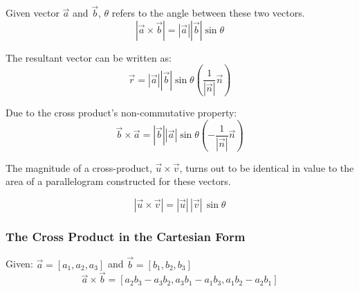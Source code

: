 Given vector $\vec{a}$ and $\vec{b}$, $\theta$ refers to the angle between these two vectors. 
$$\left|\vec{a} \times \vec{b}\right| = \left|\vec{a}\right|\left|\vec{b}\right|\sin \theta$$

The resultant vector can be written as:
$$\vec{r} = \left|\vec{a}\right| \left|\vec{b}\right| \sin \theta \left(\frac{1}{\left|\vec{n}\right|}\vec{n}\right)$$

Due to the cross product's non-commutative property:
$$\vec{b} \times  \vec{a} = \left|\vec{b}\right| \left|\vec{a}\right| \sin \theta (-\frac{1}{\left|\vec{n}\right|}\vec{n})$$

The magnitude of a cross-product, $\vec{u} \times \vec{v}$, turns out to be identical in value to the area of a parallelogram constructed for these vectors. 

\[
|\vec{u}\times\vec{v}|
=
|\vec{u}|\,|\vec{v}|\,\sin\theta
\]

\begin{center}
\end{center}

\subsubsection{The Cross Product in the Cartesian Form}
\begin{definition}
    Given: $\vec{a} = \left[a_1, a_2, a_3\right]$ and $\vec{b} = \left[b_1, b_2, b_3\right]$
    \[
        \vec{a} \times \vec{b} = \left[a_2b_3 - a_3b_2, a_3b_1 - a_1b_3, a_1b_2 - a_2b_1\right]
    \]
\end{definition}

